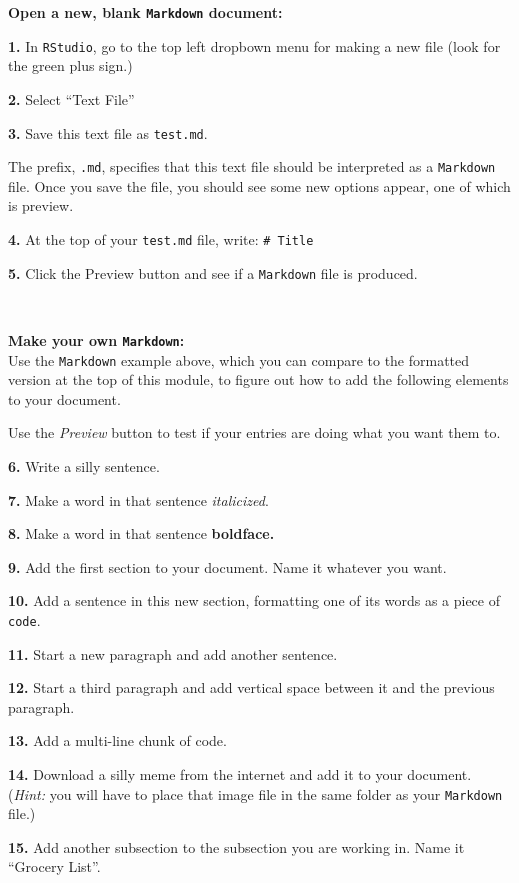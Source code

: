 \documentclass[
]{book}
\begin{document}
\textbf{Open a new, blank \texttt{Markdown} document:}

\textbf{1.} In \texttt{RStudio}, go to the top left dropbown menu for making a new file (look for the green plus sign.)

\textbf{2.} Select ``Text File''

\textbf{3.} Save this text file as \texttt{test.md}.

The prefix, \texttt{.md}, specifies that this text file should be interpreted as a \texttt{Markdown} file. Once you save the file, you should see some new options appear, one of which is preview.

\textbf{4.} At the top of your \texttt{test.md} file, write: \texttt{\#\ Title}

\textbf{5.} Click the Preview button and see if a \texttt{Markdown} file is produced.

~

\textbf{Make your own \texttt{Markdown}:}\\
Use the \texttt{Markdown} example above, which you can compare to the formatted version at the top of this module, to figure out how to add the following elements to your document.

Use the \emph{Preview} button to test if your entries are doing what you want them to.

\textbf{6.} Write a silly sentence.

\textbf{7.} Make a word in that sentence \emph{italicized}.

\textbf{8.} Make a word in that sentence \textbf{boldface.}

\textbf{9.} Add the first section to your document. Name it whatever you want.

\textbf{10.} Add a sentence in this new section, formatting one of its words as a piece of \texttt{code}.

\textbf{11.} Start a new paragraph and add another sentence.

\textbf{12.} Start a third paragraph and add vertical space between it and the previous paragraph.

\textbf{13.} Add a multi-line chunk of code.

\textbf{14.} Download a silly meme from the internet and add it to your document. (\emph{Hint:} you will have to place that image file in the same folder as your \texttt{Markdown} file.)

\textbf{15.} Add another subsection to the subsection you are working in. Name it ``Grocery List''.
\end{document}
